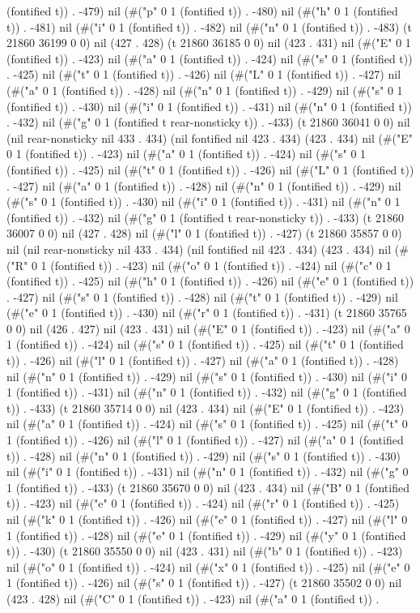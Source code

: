 (fontified t)) . -479) nil (#("p" 0 1 (fontified t)) . -480) nil (#("h" 0 1 (fontified t)) . -481) nil (#("i" 0 1 (fontified t)) . -482) nil (#("n" 0 1 (fontified t)) . -483) (t 21860 36199 0 0) nil (427 . 428) (t 21860 36185 0 0) nil (423 . 431) nil (#("E" 0 1 (fontified t)) . -423) nil (#("a" 0 1 (fontified t)) . -424) nil (#("s" 0 1 (fontified t)) . -425) nil (#("t" 0 1 (fontified t)) . -426) nil (#("L" 0 1 (fontified t)) . -427) nil (#("a" 0 1 (fontified t)) . -428) nil (#("n" 0 1 (fontified t)) . -429) nil (#("s" 0 1 (fontified t)) . -430) nil (#("i" 0 1 (fontified t)) . -431) nil (#("n" 0 1 (fontified t)) . -432) nil (#("g" 0 1 (fontified t rear-nonsticky t)) . -433) (t 21860 36041 0 0) nil (nil rear-nonsticky nil 433 . 434) (nil fontified nil 423 . 434) (423 . 434) nil (#("E" 0 1 (fontified t)) . -423) nil (#("a" 0 1 (fontified t)) . -424) nil (#("s" 0 1 (fontified t)) . -425) nil (#("t" 0 1 (fontified t)) . -426) nil (#("L" 0 1 (fontified t)) . -427) nil (#("a" 0 1 (fontified t)) . -428) nil (#("n" 0 1 (fontified t)) . -429) nil (#("s" 0 1 (fontified t)) . -430) nil (#("i" 0 1 (fontified t)) . -431) nil (#("n" 0 1 (fontified t)) . -432) nil (#("g" 0 1 (fontified t rear-nonsticky t)) . -433) (t 21860 36007 0 0) nil (427 . 428) nil (#("l" 0 1 (fontified t)) . -427) (t 21860 35857 0 0) nil (nil rear-nonsticky nil 433 . 434) (nil fontified nil 423 . 434) (423 . 434) nil (#("R" 0 1 (fontified t)) . -423) nil (#("o" 0 1 (fontified t)) . -424) nil (#("c" 0 1 (fontified t)) . -425) nil (#("h" 0 1 (fontified t)) . -426) nil (#("e" 0 1 (fontified t)) . -427) nil (#("s" 0 1 (fontified t)) . -428) nil (#("t" 0 1 (fontified t)) . -429) nil (#("e" 0 1 (fontified t)) . -430) nil (#("r" 0 1 (fontified t)) . -431) (t 21860 35765 0 0) nil (426 . 427) nil (423 . 431) nil (#("E" 0 1 (fontified t)) . -423) nil (#("a" 0 1 (fontified t)) . -424) nil (#("s" 0 1 (fontified t)) . -425) nil (#("t" 0 1 (fontified t)) . -426) nil (#("l" 0 1 (fontified t)) . -427) nil (#("a" 0 1 (fontified t)) . -428) nil (#("n" 0 1 (fontified t)) . -429) nil (#("s" 0 1 (fontified t)) . -430) nil (#("i" 0 1 (fontified t)) . -431) nil (#("n" 0 1 (fontified t)) . -432) nil (#("g" 0 1 (fontified t)) . -433) (t 21860 35714 0 0) nil (423 . 434) nil (#("E" 0 1 (fontified t)) . -423) nil (#("a" 0 1 (fontified t)) . -424) nil (#("s" 0 1 (fontified t)) . -425) nil (#("t" 0 1 (fontified t)) . -426) nil (#("l" 0 1 (fontified t)) . -427) nil (#("a" 0 1 (fontified t)) . -428) nil (#("n" 0 1 (fontified t)) . -429) nil (#("s" 0 1 (fontified t)) . -430) nil (#("i" 0 1 (fontified t)) . -431) nil (#("n" 0 1 (fontified t)) . -432) nil (#("g" 0 1 (fontified t)) . -433) (t 21860 35670 0 0) nil (423 . 434) nil (#("B" 0 1 (fontified t)) . -423) nil (#("e" 0 1 (fontified t)) . -424) nil (#("r" 0 1 (fontified t)) . -425) nil (#("k" 0 1 (fontified t)) . -426) nil (#("e" 0 1 (fontified t)) . -427) nil (#("l" 0 1 (fontified t)) . -428) nil (#("e" 0 1 (fontified t)) . -429) nil (#("y" 0 1 (fontified t)) . -430) (t 21860 35550 0 0) nil (423 . 431) nil (#("b" 0 1 (fontified t)) . -423) nil (#("o" 0 1 (fontified t)) . -424) nil (#("x" 0 1 (fontified t)) . -425) nil (#("e" 0 1 (fontified t)) . -426) nil (#("s" 0 1 (fontified t)) . -427) (t 21860 35502 0 0) nil (423 . 428) nil (#("C" 0 1 (fontified t)) . -423) nil (#("a" 0 1 (fontified t)) . 